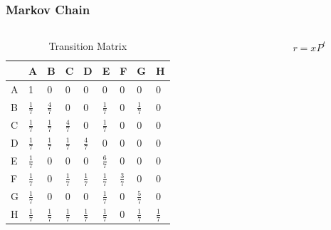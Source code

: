 \begin{frame}
\frametitle{Markov Chain}

\begin{table}
	\begin{columns}
		\begin{column}{0.6\textwidth}
			\small
			\begin{table}
				\begin{tabular}{|l|llllllll|}\hline
					& A & B & C & D & E & F & G & H \\ \hline
					A & 1 & 0 & 0 & 0 & 0 & 0 & 0 & 0 \\ \hline
					B & $\frac{1}{7}$ & $\frac{4}{7}$ & 0 & 0 & $\frac{1}{7}$ & 0 & $\frac{1}{7}$ & 0 \\\hline
					C & $\frac{1}{7}$ & $\frac{1}{7}$ & $\frac{4}{7}$ & 0 & $\frac{1}{7}$ & 0 & 0 & 0 \\\hline
					D & $\frac{1}{7}$ & $\frac{1}{7}$ & $\frac{1}{7}$ & $\frac{4}{7}$ & 0 & 0 & 0 & 0 \\\hline
					E & $\frac{1}{7}$ & 0 & 0 & 0 & $\frac{6}{7}$ & 0 & 0 & 0 \\\hline
					F & $\frac{1}{7}$ & 0 & $\frac{1}{7}$ & $\frac{1}{7}$ & $\frac{1}{7}$ & $\frac{3}{7}$ & 0 & 0 \\\hline
					G & $\frac{1}{7}$ & 0 & 0 & 0 & $\frac{1}{7}$ & 0 & $\frac{5}{7}$ & 0 \\\hline
					H & $\frac{1}{7}$ & $\frac{1}{7}$ & $\frac{1}{7}$ & $\frac{1}{7}$ & $\frac{1}{7}$ & 0 & $\frac{1}{7}$ & $\frac{1}{7}$ \\ \hline
				\end{tabular}
				\caption{Transition Matrix}
			\end{table}
		\end{column}
		\begin{column}{0.6\textwidth}
			\begin{align*}
			r = xP^t
			\end{align*}
			

\end{column}
\end{columns}
\end{table}
\end{frame}
